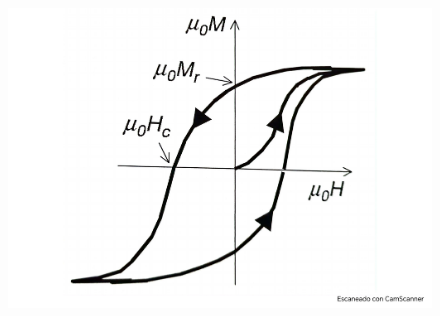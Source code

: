 \begin{figure}[h!] \centering
	\includegraphics[scale=0.5]{Cuerpo/Ch_10/Fotos libro 9.pdf}
	\caption{}
	\label{Fig:10-09}
\end{figure}